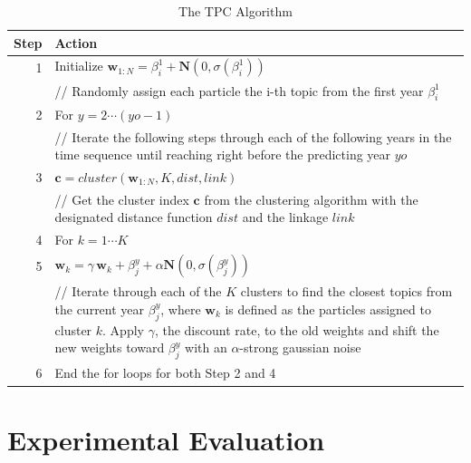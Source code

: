 \documentclass[conference]{IEEEtran}
\begin{document}
\begin{table}[h]
	\centering
	\begin{tabular}{r|p{7.25cm}}
		Step & Action\\
		\hline
		\hline
		1 & Initialize $\mathbf{w}_{1:N}=\beta^1_i + \mathbf{N}(0,\sigma(\beta^1_i))$ \\
		 & // Randomly assign each particle the i-th topic from the first year $\beta^1_i$\\
		 \hline
		2 & For $y = 2 \cdots (yo - 1)$\\
		 & // Iterate the following steps through each of the following years in the time sequence until reaching right before the predicting year $yo$\\
		 \hline
		3 & $\mathbf{c}=cluster(\mathbf{w}_{1:N}, K, dist, link)$\\
		& // Get the cluster index $\mathbf{c}$ from the clustering algorithm with the designated distance function $dist$ and the linkage $link$\\
		\hline
		4 & For $k = 1 \cdots K$ \\
		\hline
		5 & $\mathbf{w}_k = \gamma \, \mathbf{w}_k + \beta^y_j + \alpha\mathbf{N}(0,\sigma(\beta^y_j))$\\
		& // Iterate through each of the $K$ clusters to find the closest topics from the current year $\beta^y_j$, where $\mathbf{w}_k$ is defined as the particles assigned to cluster $k$. Apply $\gamma$, the discount rate, to the old weights and shift the new weights toward $\beta^y_j$ with an $\alpha$-strong gaussian noise\\
		\hline
		6 & End the for loops for both Step 2 and 4\\
	\end{tabular}
	\caption{The TPC Algorithm}
	\label{TPC_algorithm}
\end{table}


\section{Experimental Evaluation}
\end{document}

